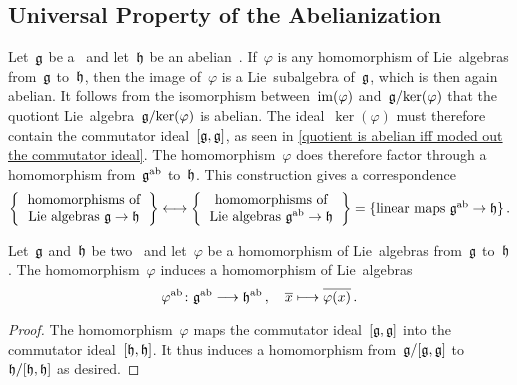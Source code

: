 \subsection{Universal Property of the Abelianization}


\begin{example}
	\label{universal property of abelianization}
	Let~$\mathfrak{g}$ be a~\liealgebra{$\kf$} and let~$\mathfrak{h}$ be an abelian~\liealgebra{$\kf$}.
	If~$\varphi$ is any homomorphism of Lie~algebras from~$\mathfrak{g}$ to~$\mathfrak{h}$, then the image of~$\varphi$ is a Lie~subalgebra of~$\mathfrak{g}$, which is then again abelian.
	It follows from the isomorphism between~$\operatorname{im}(\varphi)$ and~$\mathfrak{g} / {\ker(\varphi)}$ that the quotiont Lie~algebra~$\mathfrak{g} / {\ker(\varphi)}$ is abelian.
	The ideal~$\ker(\varphi)$ must therefore contain the commutator ideal~$[\mathfrak{g}, \mathfrak{g}]$, as seen in \cref{quotient is abelian iff moded out the commutator ideal}.
	The homomorphism~$\varphi$ does therefore factor through a homomorphism from~$\mathfrak{g}^{\mathrm{ab}}$ to~$\mathfrak{h}$.
	This construction gives a {\onetoonetext} correspondence
	\[
		\left\{
			\begin{tabular}{c}
				homomorphisms of \\
				Lie~algebras~$\glie \to \hlie$
			\end{tabular}
		\right\}
		\onetoone
		\left\{
			\begin{tabular}{c}
				homomorphisms of \\
				Lie~algebras $\glie^{\ab} \to \hlie$
			\end{tabular}
		\right\}
		=
		\{
			\textstyle
			\text{linear maps~$\glie^{\ab} \to \hlie$}
		\} \,.
	\]
\end{example}


\begin{proposition}
	\label{functoriality of abelianization}
	Let~$\mathfrak{g}$ and~$\mathfrak{h}$ be two~\liealgebras{$\kf$} and let~$\varphi$ be a homomorphism of Lie~algebras from~$\mathfrak{g}$ to~$\mathfrak{h}$.
	The homomorphism~$\varphi$ induces a homomorphism of Lie~algebras
	\[
		\varphi^{\ab}
		\colon
		\glie^{\ab}
		\to
		\hlie^{\ab} \,,
		\quad
		\class{x}
		\mapsto
		\class{\varphi(x)} \,.
	\]
\end{proposition}


\begin{proof}
	The homomorphism~$\varphi$ maps the commutator ideal~$[\mathfrak{g}, \mathfrak{g}]$ into the commutator ideal~$[\mathfrak{h}, \mathfrak{h}]$.
	It thus induces a homomorphism from~$\mathfrak{g} / [\mathfrak{g}, \mathfrak{g}]$ to~$\mathfrak{h} / [\mathfrak{h}, \mathfrak{h}]$ as desired.
\end{proof}


